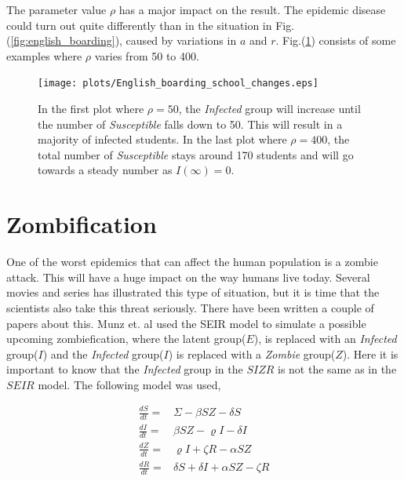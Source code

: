 \documentclass[%
twoside,                 %
final,                   %
10pt]{article}
\begin{document}
The parameter value $\rho$ has a major impact on the result. The epidemic disease could turn out quite differently than in the situation in Fig.(\ref{fig:english_boarding}), caused by variations in $a$ and $r$. Fig.(\ref{fig:rho_changes}) consists of some examples where $\rho$ varies from 50 to 400.


\begin{figure}[ht]
  \centerline{\texttt{[image: plots/English\_boarding\_school\_changes.eps]}}
  \caption{
  \label{fig:rho_changes} In the first plot where $\rho=50$, the \emph{Infected} group will increase until the number of \emph{Susceptible} falls down to 50. This will result in a majority of infected students. In the last plot where $\rho=400$, the total number of \emph{Susceptible} stays around 170 students and will go towards a steady number as $I(\infty)=0$.
  }
\end{figure}


\section{Zombification}
One of the worst epidemics that can affect the human population is a zombie attack. This will have a huge impact on the way humans live today. Several movies and series has illustrated this type of situation, but it is time that the scientists also take this threat seriously. There have been written a couple of papers about this. Munz et. al\cite{munz2009zombies} used the SEIR model to simulate a possible upcoming zombiefication, where the latent group($E$), is replaced with an \emph{Infected} group($I$) and the \emph{Infected} group($I$) is replaced with a \emph{Zombie} group($Z$). Here it is important to know that the \emph{Infected} group in the $SIZR$ is not the same as in the $SEIR$ model. The following model was used,

\begin{align*}
\frac{dS}{dt} =& \Sigma -\beta SZ - \delta S \\
\frac{dI}{dt} =& \beta SZ - \varrho I - \delta I\\
\frac{dZ}{dt} =& \varrho I + \zeta R - \alpha SZ\\
\frac{dR}{dt} =& \delta S + \delta I + \alpha SZ - \zeta R
\end{align*}
\end{document}
